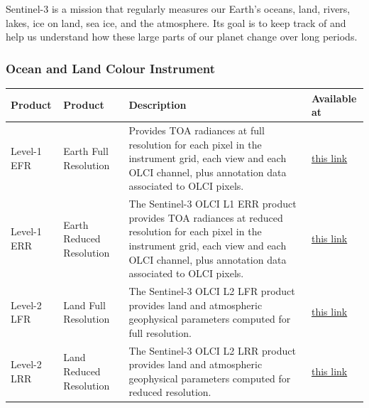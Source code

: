 \documentclass[
  letterpaper,
  DIV=11,
  numbers=noendperiod]{scrreprt}
\begin{document}
Sentinel-3 is a mission that regularly measures our Earth's oceans,
land, rivers, lakes, ice on land, sea ice, and the atmosphere. Its goal
is to keep track of and help us understand how these large parts of our
planet change over long periods.

\subsubsection{Ocean and Land Colour
Instrument}\label{ocean-and-land-colour-instrument}

\begin{longtable}[]{@{}
  >{\raggedright\arraybackslash}p{}
  >{\raggedright\arraybackslash}p{}
  >{\raggedright\arraybackslash}p{}
  >{\raggedright\arraybackslash}p{}@{}}
\toprule\noalign{}
\begin{minipage}[b]{\linewidth}\raggedright
Product
\end{minipage} & \begin{minipage}[b]{\linewidth}\raggedright
Product
\end{minipage} & \begin{minipage}[b]{\linewidth}\raggedright
Description
\end{minipage} & \begin{minipage}[b]{\linewidth}\raggedright
Available at
\end{minipage} \\
\midrule\noalign{}
\endhead
\bottomrule\noalign{}
\endlastfoot
Level-1 EFR & Earth Full Resolution & Provides TOA radiances at full
resolution for each pixel in the instrument grid, each view and each
OLCI channel, plus annotation data associated to OLCI pixels. &
\href{https://stac.browser.user.eopf.eodc.eu/collections/sentinel-3-olci-l1-efr}{this
link} \\
Level-1 ERR & Earth Reduced Resolution & The Sentinel-3 OLCI L1 ERR
product provides TOA radiances at reduced resolution for each pixel in
the instrument grid, each view and each OLCI channel, plus annotation
data associated to OLCI pixels. &
\href{https://stac.browser.user.eopf.eodc.eu/collections/sentinel-3-olci-l1-err}{this
link} \\
Level-2 LFR & Land Full Resolution & The Sentinel-3 OLCI L2 LFR product
provides land and atmospheric geophysical parameters computed for full
resolution. &
\href{https://stac.browser.user.eopf.eodc.eu/collections/sentinel-3-olci-l2-lfr}{this
link} \\
Level-2 LRR & Land Reduced Resolution & The Sentinel-3 OLCI L2 LRR
product provides land and atmospheric geophysical parameters computed
for reduced resolution. &
\href{https://stac.browser.user.eopf.eodc.eu/collections/sentinel-3-olci-l2-lrr}{this
link} \\
\end{longtable}
\end{document}
